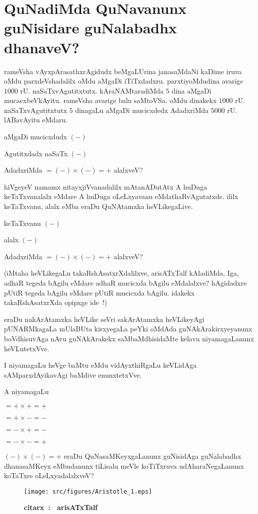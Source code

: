\chapter{QuNadiMda QuNavanunx guNisidare guNalabadhx dhanaveV?}

rameVsha vAyxpArasathxrAgidudx beMgaLUrina janasaMdaNi kaDime iruva oMdu parxdeVshadalilx oMdu aMgaDi iTiTxdadxru. parxtiyoMdudina avarige $1000$ rU. naSaTxvAgutitxtutx.  kAraNAMtaradiMda $5$ dina aMgaDi mucacxbeVkAyitu. rameVsha avarige balu saMtoVSa. oMdu dinakekx $1000$ rU. naSaTxvAgutitxtutx $5$ dinagaLu aMgaDi mucicxdedx AdadxriMda $5000$ rU. lABavAyitu eMdaru. 

aMgaDi mucicxdudx $(-)$

Agutitxdadx naSaTx $(-)$

AdadxriMda $= (-) \times (-) = + $ alalxveV?

hiVgeyeV namamx nitayxjiVvanadalilx mAtanADutAtx A huDuga keTaTxvanalalx eMdare A huDuga oLeLxyavanu eMdathaRvAgutatxde. ililx keTaTxvanu, alalx eMba eraDu QuNAtamxka heVLikegaLive.

keTaTxvanu $(-)$

alalx $(-)$

AdadxriMda $= (-) \times  (-) = +$ alalxveV?

(iMtaha heVLikegaLu takaRshAsatxrXdalilxve, arisATxTalf kAladiMda. Iga, adhaR tegeda bAgilu eMdare adhaR mucicxda bAgilu eMdalalxve? hAgidadxre pUtiR tegeda bAgilu eMdare pUtiR mucicxda bAgilu. idakekx takaRshAsatxrXda opipxge ide~!)

eraDu nakArAtamxka heVLike seVri sakArAtamxka heVLikeyAgi pUNARMkagaLa mUlaBUta kirxyegaLa peYki oMdAda guNAkArakirxyeyanunx boVdhisuvAga nAvu guNAkArakekx saMbaMdhisidaMte kelavu niyamagaLanunx heVLutetxVve.

I niyamagaLu heVge baMtu eMdu vidAyxthiRgaLu keVLidAga sAMparxdAyikavAgi baMdive enunxtetxVve.

A niyamagaLu

$= + \times + = +$

$= + \times - = -$

$= - \times + = -$

$= - \times - = +$

$(-) \times (-) = +$ eraDu QuNasaMKeyxgaLanunx guNisidAga guNalabadhx dhanasaMKeyx eMbudanunx tiLisalu meVle koTiTxruva udAharaNegaLanunx koTaTxre oLeLxyadalalxveV?
\begin{figure}[H]
  \centering\texttt{[image: src/figures/Aristotle\_1.eps]}
  
  {\bf citarx~: ~arisATxTalf} 
     \end{figure}
   

